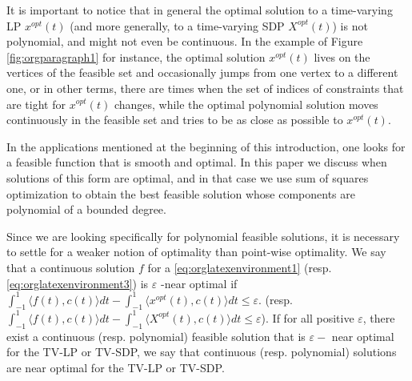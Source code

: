 \documentclass[moor]{informs1}
\begin{document}
It is important to notice that in general the optimal solution to a time-varying LP \(x^{opt}(t)\) (and more generally, to a time-varying SDP \(X^{opt}(t)\)) is not polynomial, and might not even be continuous. In the example of Figure \ref{fig:orgparagraph1} for instance, the optimal solution \(x^{opt}(t)\) lives on the vertices of the feasible set and occasionally jumps from one vertex to a different one, or in other terms, there are times when the set of indices of constraints that are tight for \(x^{opt}(t)\) changes, while the optimal polynomial solution moves continuously in the feasible set and tries to be as close as possible to \(x^{opt}(t)\).


In the applications mentioned at the beginning of this introduction, one looks for a feasible function that is smooth and optimal. In this paper we discuss when solutions of this form are optimal, and in that case we use sum of squares optimization to obtain the best feasible solution whose components are polynomial of a bounded degree.

Since we are looking specifically for polynomial feasible solutions, it is necessary to settle for a weaker notion of optimality than point-wise optimality. We say that a continuous solution \(f\) for a \ref{eq:orglatexenvironment1} (resp. \ref{eq:orglatexenvironment3}) is \(\varepsilon\) -near optimal if \(\int_{-1}^1 \langle f(t), c(t)\rangle dt - \int_{-1}^1 \langle x^{opt}(t), c(t)\rangle dt \le \varepsilon\). (resp. \(\int_{-1}^1 \langle f(t), c(t)\rangle dt - \int_{-1}^1 \langle X^{opt}(t), c(t)\rangle dt \le \varepsilon\)). If for all positive \(\varepsilon\), there exist a continuous (resp. polynomial) feasible solution that is \(\varepsilon-\) near optimal for the TV-LP or TV-SDP, we say that continuous (resp. polynomial) solutions are near optimal for the TV-LP or TV-SDP.
\end{document}
